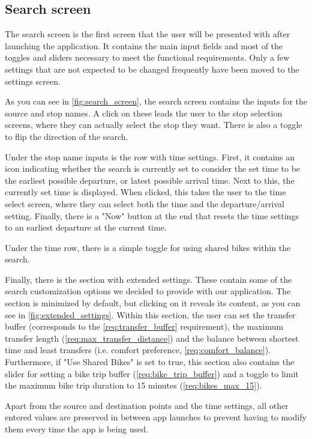 \subsection{Search screen}

The search screen is the first screen that the user will be presented with after launching the application. It contains the main input fields and most of the toggles and sliders necessary to meet the functional requirements. Only a few settings that are not expected to be changed frequently have been moved to the settings screen.

As you can see in \cref{fig:search_screen}, the search screen contains the inputs for the source and stop names. A click on these leads the user to the stop selection screens, where they can actually select the stop they want. There is also a toggle to flip the direction of the search.

Under the stop name inputs is the row with time settings. First, it contains an icon indicating whether the search is currently set to consider the set time to be the earliest possible departure, or latest possible arrival time. Next to this, the currently set time is displayed. When clicked, this takes the user to the time select screen, where they can select both the time and the departure/arrival setting. Finally, there is a "Now" button at the end that resets the time settings to an earliest departure at the current time.

Under the time row, there is a simple toggle for using shared bikes within the search. 

Finally, there is the section with extended settings. These contain some of the search customization options we decided to provide with our application. The section is minimized by default, but clicking on it reveals its content, as you can see in \cref{fig:extended_settings}. Within this section, the user can set the transfer buffer (corresponds to the \cref{req:transfer_buffer} requirement), the maximum transfer length (\cref{req:max_transfer_distance}) and the balance between shortest time and least transfers (i.e. comfort preference, \cref{req:comfort_balance}). Furthermore, if "Use Shared Bikes" is set to true, this section also contains the slider for setting a bike trip buffer (\cref{req:bike_trip_buffer}) and a toggle to limit the maximum bike trip duration to 15 minutes (\cref{req:bikes_max_15}).

Apart from the source and destination points and the time settings, all other entered values are preserved in between app launches to prevent having to modify them every time the app is being used.

